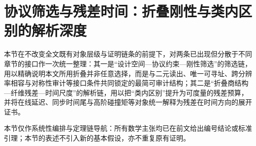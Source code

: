 \section{协议筛选与残差时间：折叠刚性与类内区别的解析深度}\label{sec:fold-residual-time}

本节在不改变全文既有对象层级与证明链条的前提下，对两条已出现但分散于不同章节的接口作一次统一整理：其一是“设计空间—协议约束—刚性筛选”的筛选链，用以精确说明本文所用折叠并非任意选择，而是与二元读出、唯一可寻址、跨分辨率相容与对称性审计等接口条件共同锁定的最简可审计结构；其二是“折叠商结构—纤维残差—时间尺度”的解析链，用以把“类内区别”提升为可度量的残差预算，并将在线延迟、同步时间尾与高阶碰撞矩等对象统一解释为残差在时间方向的展开证书。\par
本节仅作系统性编排与定理链导航：所有数学主张均已在前文给出编号结论或标准引理；本节的表述不引入新的基本假设，亦不重复原有证明。







